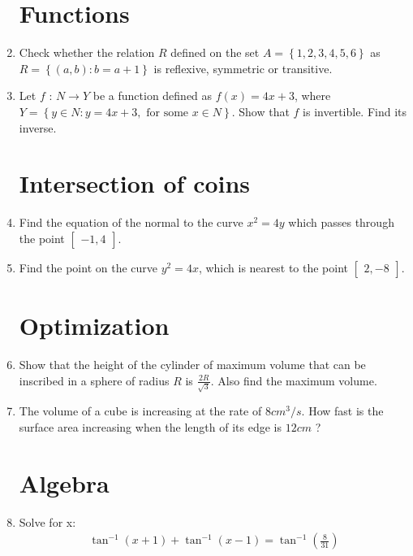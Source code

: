 \documentclass[2pt,-letter paper]{article}
\providecommand{\myvec}[1]{\ensuremath{\begin{bmatrix}#1\end{bmatrix}}}
\providecommand{\cbrak}[1]{\ensuremath{\left\{#1\right\}}}
\providecommand{\brak}[1]{\ensuremath{\left(#1\right)}}
\begin{document}
\begin{enumerate}
\section {Functions}
\item Check whether the relation $R$ defined on the set $A=\cbrak{1,2,3,4,5,6}$ as $R =\cbrak {(a, b) : b = a + 1}$ is reflexive, symmetric or transitive.
\item Let $f$ : $N\rightarrow Y $ be a function defined as $f\brak{x}= 4x + 3$, where $Y=\cbrak{y\in N:y=4x+3, \text{ for some } x\in N}$. Show that $f$ is invertible. Find its inverse.
\section{Intersection of coins}
\item Find the equation of the normal to the curve ${x}^2 = 4y$ which passes through the point $\myvec{-1,4}$.
\item Find the point on the curve ${y}^2 = 4x$, which is nearest to the point $\myvec{2,-8}$.
\section{Optimization}
\item Show that the height of the cylinder of maximum volume that can be inscribed in a sphere of radius $R$ is $\frac{2R}{\sqrt{3}}$. Also find the maximum volume.
\item The volume of a cube is increasing at the rate of $8 cm^3/s$. How fast is the surface area increasing when the length of its edge is $12 cm$ ?
\section{Algebra}
\item Solve for x:
\begin{align*}
\tan^{-1}\brak{x+1}+\tan^{-1}\brak{x-1}=\tan^{-1}\brak{\frac{8}{31}}
\end{align*}
\end{enumerate}
\end{document}
